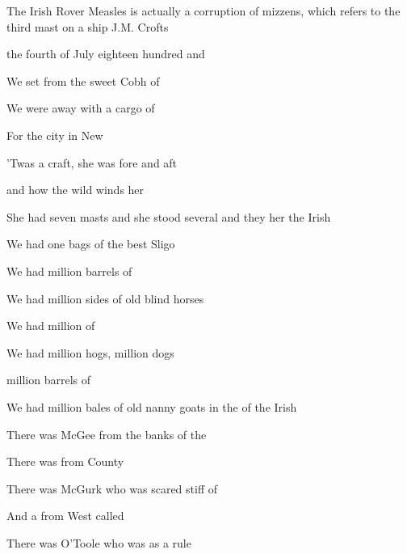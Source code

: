 \begin{SBSong}{The Irish Rover}
  {Measles is actually a corruption of mizzens, which refers to the third mast on a ship}
  {J.M. Crofts}
  \begin{SBVerse}
     the fourth of July eighteen hundred and 

    We set  from the sweet Cobh of 

    We were  away with a cargo of  

    For the  city  in New 

    'Twas a  craft, she was  fore and aft 

    and  how the wild winds  her 

    She had  seven masts and she stood several \CBLineBrk  
      and they  her the Irish 
  \end{SBVerse}
  \begin{SBVerse}
    We had one  bags of the best Sligo 

    We had  million barrels of 

    We had  million sides of old blind horses 

    We had  million  of 

    We had  million hogs,  million dogs

     million barrels of 

    We had  million bales of old nanny goats  \CBLineBrk\WBLineBrk 
      in the  of the Irish 
  \end{SBVerse}
  \begin{SBVerse}
    There was  McGee from the banks of the 

    There was  from County 

    There was  McGurk who was scared stiff of 

    And a  from West called 

    There was  O'Toole who was  as a rule


\end{SBVerse}
\end{SBSong}
